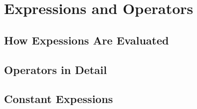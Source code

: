 \section{Expressions and Operators}

\subsection{How Expessions Are Evaluated}
\subsection{Operators in Detail}
\subsection{Constant Expessions}